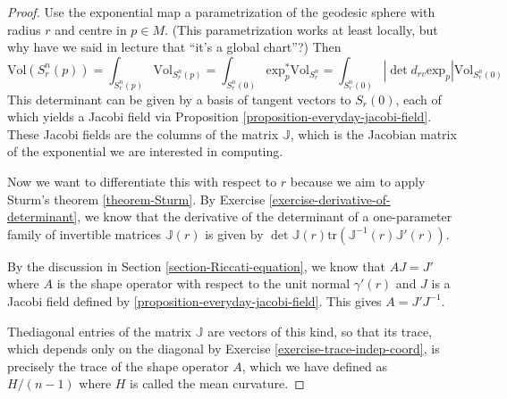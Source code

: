 \begin{proof}
Use the exponential map a parametrization of
the geodesic sphere with radius
$r$ and centre in $p\in M$. (This
parametrization works at least locally, but
why
have we said in lecture that ``it's a global
chart''?) Then
$$
\text{Vol}(S^n_r(p))=\int_{S^n_r(p)}
\text{Vol}_{S^n_r(p)}=
\int_{S^n_r(0)}\text{exp}_p^*\text{Vol}
_{S^n_r}=
\int_{S^n_r(0)}|\det d_{rv}
\text{exp}_p|\text{Vol}_{S^n_r(0)}
$$
This determinant can be given by a basis of
tangent vectors to $S_r(0)$, each of
which yields a Jacobi field via Proposition
\ref{proposition-everyday-jacobi-field}.
These Jacobi fields are the columns
of the matrix $\mathbb{J}$, which is the
Jacobian matrix of the exponential we
are interested in computing.

Now we want to differentiate this with
respect to $r$ because we aim to apply
Sturm's theorem \ref{theorem-Sturm}. By
Exercise
\ref{exercise-derivative-of-determinant}, we
know that the derivative of the
determinant of a one-parameter family of
invertible matrices $\mathbb{J}(r)$ is
given by $\det
\mathbb{J}(r)\text{tr}(\mathbb{J}^{-1}(r)
\mathbb{J}'(r))$.

By the discussion in Section
\ref{section-Riccati-equation}, we know that
$AJ=J'$ where $A$ is the shape operator with
respect to the unit normal
$\gamma'(r)$ and $J$ is a Jacobi field
defined by
\ref{proposition-everyday-jacobi-field}.
This gives $A=J'J^{-1}$.

Thediagonal entries of the matrix
$\mathbb{J}$ are vectors of this kind, so
that
 its trace, which depends only on the
 diagonal by Exercise
\ref{exercise-trace-indep-coord}, is
precisely the trace of
the shape operator $A$, which we have defined
as $H/(n-1)$ where
$H$ is called the mean curvature.


\end{proof}
